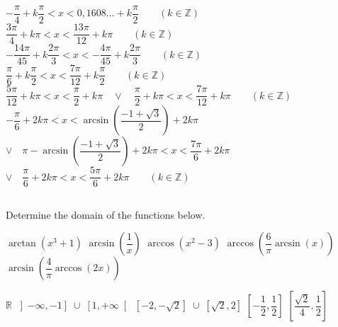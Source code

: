 \begin{Answer}\phantom{}

    	\Question $-\dfrac{\pi}{4} + k \dfrac{\pi}{2} < x < 0,1608\ldots +k\dfrac{\pi}{2} \qquad (k\in \mathbb{Z})$	 
    	\Question $\dfrac{3\pi}{4} + k\pi < x < \dfrac{13\pi}{12} + k\pi \qquad (k\in \mathbb{Z})$	 
    	\Question $-\dfrac{14\pi}{45} + k\dfrac{2\pi}{3} < x < - \dfrac{4\pi}{45} + k \dfrac{2\pi}{3} \qquad (k\in \mathbb{Z})$
    	\Question $\dfrac{\pi}{6} + k \dfrac{\pi}{2} < x < \dfrac{7\pi}{12} + k\dfrac{\pi}{2} \qquad (k \in \mathbb{Z})$
    	\Question $\dfrac{5\pi}{12} + k\pi < x < \dfrac{\pi}{2} + k\pi  \quad  \vee \quad \dfrac{\pi}{2} + k\pi < x < \dfrac{7\pi}{12} + k \pi \qquad(k \in \mathbb{Z})$ 
    	\Question $-\dfrac{\pi}{6} + 2k\pi < x < \arcsin \left( \dfrac{-1+\sqrt{3}}{2}\right) + 2k \pi $ \\[0.2cm]  
    	$ \vee \quad \pi - \arcsin \left( \dfrac{-1+\sqrt{3}}{2}\right)  + 2k\pi < x < \dfrac{7\pi}{6} + 2k\pi $ \\[0.2cm]
    	$\vee \quad \dfrac{\pi}{6} + 2k\pi < x < \dfrac{5\pi}{6} + 2k \pi  \qquad (k\in \mathbb{Z})$
 
\end{Answer}

\ifanalysis\pagebreak\fi
\subsection*{}

\begin{Exercise} Determine the domain of the functions below. 
\begin{multicols}{2}
	\Question[difficulty = 1] $\arctan(x^3+1)$	 
	\Question[difficulty = 1] $\arcsin \left(\dfrac{1}{x} \right)$	 
	\Question[difficulty = 1] $\arccos(x^2-3)$	 
	\Question[difficulty = 2] $\arccos \left(\dfrac{6}{\pi} \arcsin (x) \right)$	
	\Question[difficulty = 2] $\arcsin \left(\dfrac{4}{\pi} \arccos (2x) \right)$	
	\EndCurrentQuestion
\end{multicols}

\end{Exercise}

\begin{Answer}\phantom{}
    \begin{multicols}{2}
    	
    		\Question $\mathbb{R}$	 
    		\Question $\left]-\infty,-1\right]\; \cup \; \left[1,+\infty\right[$	 
    		\Question $\left[-2,-\sqrt{2}\right] \; \cup \; \left[\sqrt{2},2\right]$	 
    		\Question $\left[-\dfrac{1}{2},\dfrac{1}{2}\right]$	 
    		\Question $\left[\dfrac{\sqrt{2}}{4},\dfrac{1}{2}\right]$	 
    	\EndCurrentQuestion
    \end{multicols}
\end{Answer}

